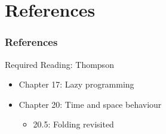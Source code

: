 \documentclass[dvipsnames]{beamer}
\theoremstyle{plain}
\begin{document}
\section*{References}

\begin{frame}
  \frametitle{References}

  \begin{block}{Required Reading: Thompson}
    \begin{itemize}
      \item Chapter 17: \alert{Lazy programming}
      \item Chapter 20: Time and space behaviour
      \begin{itemize}
        \item 20.5: \alert{Folding revisited}
      \end{itemize}
    \end{itemize}
  \end{block}
\end{frame}
\end{document}
